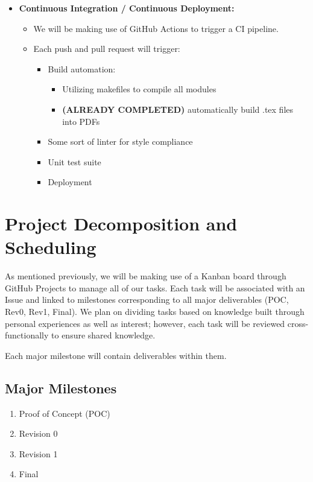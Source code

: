 \documentclass{article}
\begin{document}
\begin{itemize}
    \item \textbf{Continuous Integration / Continuous Deployment:}
    \begin{itemize}
        \item We will be making use of GitHub Actions to trigger a CI pipeline.
        \item Each push and pull request will trigger:
        \begin{itemize}
            \item Build automation:
            \begin{itemize}
                \item Utilizing makefiles to compile all modules
                \item \textbf{(ALREADY COMPLETED)} automatically build .tex files into PDFs
            \end{itemize}
            \item Some sort of linter for style compliance
            \item Unit test suite
            \item Deployment
        \end{itemize}
    \end{itemize}
\end{itemize}

\section{Project Decomposition and Scheduling}


As mentioned previously, we will be making use of a Kanban board through GitHub Projects to manage all of our tasks. Each task will be associated with an Issue and linked to milestones corresponding to all major deliverables (POC, Rev0, Rev1, Final). We plan on dividing tasks based on knowledge built through personal experiences as well as interest; however, each task will be reviewed cross-functionally to ensure shared knowledge.

\noindent
Each major milestone will contain deliverables within them.

\subsection*{Major Milestones}
\begin{enumerate}
    \item Proof of Concept (POC)
    \item Revision 0
    \item Revision 1
    \item Final
\end{enumerate}
\end{document}
